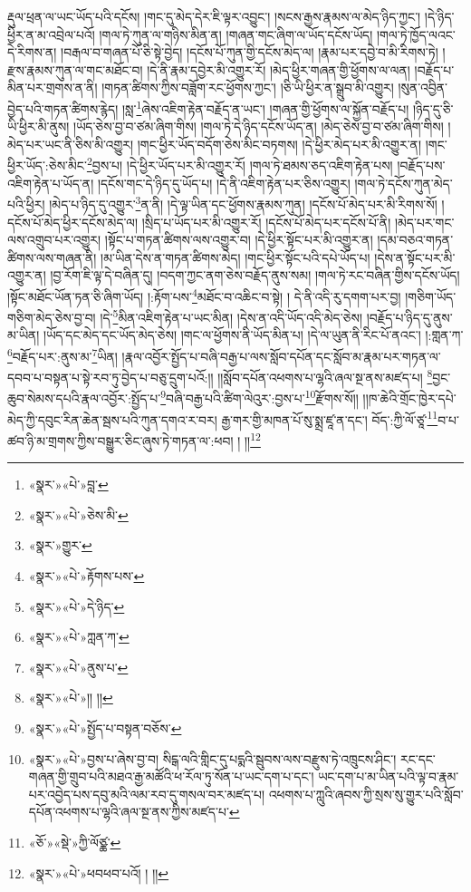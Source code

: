 རྡུལ་ཕྲན་ལ་ཡང་ཡོད་པའི་དངོས། །གང་དུ་མེད་དེར་ཇི་ལྟར་འབྱུང་། །སངས་རྒྱས་རྣམས་ལ་མེད་ཉིད་ཀྱང་། །དེ་ཉིད་ཕྱིར་ན་མ་འབྲེལ་པའོ། །གལ་ཏེ་ཀུན་ལ་གཉིས་མིན་ན། །གཞན་གང་ཞིག་ལ་ཡོད་དངོས་ཡོད། །གལ་ཏེ་ཁྱོད་ལའང་དེ་རིགས་ན། །བརྒལ་བ་གཞན་པོ་ཅི་སྟེ་བྱེད། །དངོས་པོ་ཀུན་གྱི་དངོས་མེད་ལ། །རྣམ་པར་དབྱེ་བ་མི་རིགས་ཏེ། །རྫས་རྣམས་ཀུན་ལ་གང་མཐོང་བ། །དེ་ནི་རྣམ་དབྱེར་མི་འགྱུར་རོ། །མེད་ཕྱིར་གཞན་གྱི་ཕྱོགས་ལ་ལན། །བརྗོད་པ་མིན་པར་གྲགས་ན་ནི། །གཏན་ཚིགས་ཀྱིས་བཟློག་རང་ཕྱོགས་ཀྱང་། །ཅི་ཡི་ཕྱིར་ན་སྒྲུབ་མི་འགྱུར། །སུན་འབྱིན་བྱེད་པའི་གཏན་ཚིགས་རྙེད། །སླ་\footnote{«སྣར་»«པེ་»བླ་}ཞེས་འཇིག་རྟེན་བརྗོད་ན་ཡང་། །གཞན་གྱི་ཕྱོགས་ལ་སྐྱོན་བརྗོད་པ། །ཉིད་དུ་ཅི་ཡི་ཕྱིར་མི་ནུས། །ཡོད་ཅེས་བྱ་བ་ཙམ་ཞིག་གིས། །གལ་ཏེ་དེ་ཉིད་དངོས་ཡོད་ན། །མེད་ཅེས་བྱ་བ་ཙམ་ཞིག་གིས། །མེད་པར་ཡང་ནི་ཅིས་མི་འགྱུར། །གང་ཕྱིར་ཡོད་བདོག་ཅེས་མིང་བཏགས། །དེ་ཕྱིར་མེད་པར་མི་འགྱུར་ན། །གང་ཕྱིར་ཡོད་:ཅེས་མིང་\footnote{«སྣར་»«པེ་»ཅེས་མི་}བྱས་པ། །དེ་ཕྱིར་ཡོད་པར་མི་འགྱུར་རོ། །གལ་ཏེ་ཐམས་ཅད་འཇིག་རྟེན་པས། །བརྗོད་པས་འཇིག་རྟེན་པ་ཡོད་ན། །དངོས་གང་དེ་ཉིད་དུ་ཡོད་པ། །དེ་ནི་འཇིག་རྟེན་པར་ཅིས་འགྱུར། །གལ་ཏེ་དངོས་ཀུན་མེད་པའི་ཕྱིར། །མེད་པ་ཉིད་དུ་འགྱུར་\footnote{«སྣར་»གྱུར་}ན་ནི། །དེ་ལྟ་ཡིན་དང་ཕྱོགས་རྣམས་ཀུན། །དངོས་པོ་མེད་པར་མི་རིགས་སོ། །དངོས་པོ་མེད་ཕྱིར་དངོས་མེད་ལ། །སྲིད་པ་ཡོད་པར་མི་འགྱུར་རོ། །དངོས་པོ་མེད་པར་དངོས་པོ་ནི། །མེད་པར་གང་ལས་འགྲུབ་པར་འགྱུར། །སྟོང་པ་གཏན་ཚིགས་ལས་འགྱུར་བ། །དེ་ཕྱིར་སྟོང་པར་མི་འགྱུར་ན། །དམ་བཅའ་གཏན་ཚིགས་ལས་གཞན་ནི། །མ་ཡིན་དེས་ན་གཏན་ཚིགས་མེད། །གང་ཕྱིར་སྟོང་པའི་དཔེ་ཡོད་པ། །དེས་ན་སྟོང་པར་མི་འགྱུར་ན། །བྱ་རོག་ཇི་ལྟ་དེ་བཞིན་དུ། །བདག་ཀྱང་ནག་ཅེས་བརྗོད་ནུས་སམ། །གལ་ཏེ་རང་བཞིན་གྱིས་དངོས་ཡོད། །སྟོང་མཐོང་ཡོན་ཏན་ཅི་ཞིག་ཡོད། །:རྟོག་པས་\footnote{«སྣར་»«པེ་»རྟོགས་པས་}མཐོང་བ་འཆིང་བ་སྟེ། །
དེ་ནི་འདི་རུ་དགག་པར་བྱ། །གཅིག་ཡོད་གཅིག་མེད་ཅེས་བྱ་བ། །དེ་\footnote{«སྣར་»«པེ་»དེ་ཉིད་}མིན་འཇིག་རྟེན་པ་ཡང་མིན། །དེས་ན་འདི་ཡོད་འདི་མེད་ཅེས། །བརྗོད་པ་ཉིད་དུ་ནུས་མ་ཡིན། །ཡོད་དང་མེད་དང་ཡོད་མེད་ཅེས། །གང་ལ་ཕྱོགས་ནི་ཡོད་མིན་པ། །དེ་ལ་ཡུན་ནི་རིང་པོ་ནའང་། །:གླན་ཀ་\footnote{«སྣར་»«པེ་»ཀླན་ཀ་}བརྗོད་པར་:ནུས་མ་\footnote{«སྣར་»«པེ་»ནུས་པ་}ཡིན། །རྣལ་འབྱོར་སྤྱོད་པ་བཞི་བརྒྱ་པ་ལས་སློབ་དཔོན་དང་སློབ་མ་རྣམ་པར་གཏན་ལ་དབབ་པ་བསྟན་པ་སྟེ་རབ་ཏུ་བྱེད་པ་བཅུ་དྲུག་པའོ:།། །།སློབ་དཔོན་འཕགས་པ་ལྷའི་ཞལ་སྔ་ནས་མཛད་པ། \footnote{«སྣར་»«པེ་»།། །།}བྱང་ཆུབ་སེམས་དཔའི་རྣལ་འབྱོར་:སྤྱོད་པ་\footnote{«སྣར་»«པེ་»སྤྱོད་པ་བསྟན་བཅོས་}བཞི་བརྒྱ་པའི་ཚིག་ལེའུར་:བྱས་པ་\footnote{«སྣར་»«པེ་»བྱས་པ་ཞེས་བྱ་བ། སིངྒ་ལའི་གླིང་དུ་པདྨའི་སྦུབས་ལས་བརྫུས་ཏེ་འཁྲུངས་ཤིང་། རང་དང་གཞན་གྱི་གྲུབ་པའི་མཐའ་རྒྱ་མཚོའི་ཕ་རོལ་ཏུ་སོན་པ་ཡང་དག་པ་དང་། ཡང་དག་པ་མ་ཡིན་པའི་ལྟ་བ་རྣམ་པར་འབྱེད་པས་དབུ་མའི་ལམ་རབ་དུ་གསལ་བར་མཛད་པ། འཕགས་པ་ཀླུའི་ཞབས་ཀྱི་སྲས་སུ་གྱུར་པའི་སློབ་དཔོན་འཕགས་པ་ལྷའི་ཞལ་སྔ་ནས་ཀྱིས་མཛད་པ་}རྫོགས་སོ།། །།ཁ་ཆེའི་གྲོང་ཁྱེར་དཔེ་མེད་ཀྱི་དབུང་རིན་ཆེན་སྦས་པའི་ཀུན་དགའ་ར་བར། རྒྱ་གར་གྱི་མཁན་པོ་སུ་སྨྲ་ཛཱ་ན་དང་། བོད་:ཀྱི་ལོ་ཙཱ་\footnote{«ཅོ་»«སྡེ་»ཀྱི་ལོཙྪ་}བ་པ་ཚབ་ཉི་མ་གྲགས་ཀྱིས་བསྒྱུར་ཅིང་ཞུས་ཏེ་གཏན་ལ་:ཕབ། ། །།\footnote{«སྣར་»«པེ་»ཕབཕབ་པའོ། ། །།}